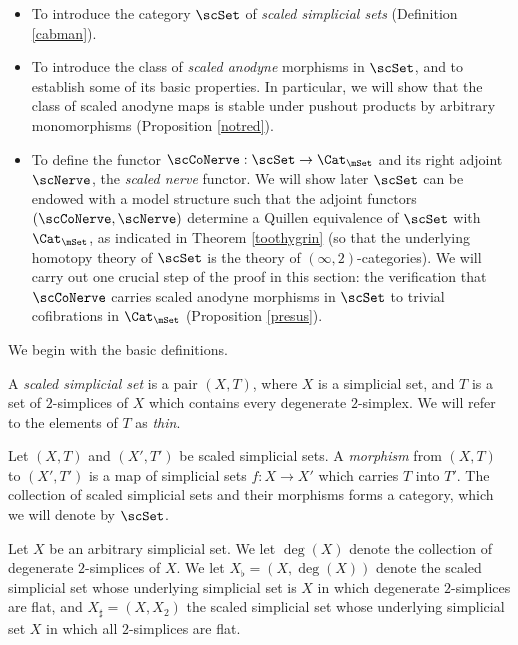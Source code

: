 \begin{itemize}
\item[$(a)$] To introduce the category $\scSet$ of {\it scaled simplicial sets}
(Definition \ref{cabman}).

\item[$(b)$] To introduce the class of {\it scaled anodyne} morphisms in
$\scSet$, and to establish some of its basic properties.
In particular, we will show that the class of scaled anodyne maps is stable
under pushout products by arbitrary monomorphisms (Proposition \ref{notred}).

\item[$(c)$] To define the functor $\scCoNerve: \scSet \rightarrow \Cat_{\mSet}$ and
its right adjoint $\scNerve$, the {\it scaled nerve} functor. We will show later
$\scSet$ can be endowed with a model structure such that the adjoint functors
$(\scCoNerve, \scNerve)$ determine a Quillen equivalence of $\scSet$ with
$\Cat_{\mSet}$, as indicated in Theorem \ref{toothygrin} (so that the underlying
homotopy theory of $\scSet$ is the theory of $(\infty,2)$-categories). We will carry
out one crucial step of the proof in this section: the verification that
$\scCoNerve$ carries scaled anodyne morphisms in $\scSet$ to
trivial cofibrations in $\Cat_{\mSet}$ (Proposition \ref{presus}).
\end{itemize}

We begin with the basic definitions.

\begin{definition}\label{cabman}
A {\it scaled simplicial set} is a pair $(X, T)$, where
$X$ is a simplicial set, and $T$ is
a set of $2$-simplices of $X$ which contains every degenerate $2$-simplex.
We will refer to the elements of $T$ as {\it thin}.

Let $(X,T)$ and $(X',T')$ be scaled simplicial sets. A {\it morphism} from 
$(X,T)$ to $(X',T')$ is a map of simplicial sets $f: X \rightarrow X'$ which
carries $T$ into $T'$. The collection of scaled simplicial sets and their morphisms
forms a category, which we will denote by $\scSet$.
\end{definition}

\begin{notation}
Let $X$ be an arbitrary simplicial set. We let
$\deg(X)$ denote the collection of degenerate $2$-simplices of $X$.
We let $X_{\flat} = (X, \deg(X) )$ denote the scaled simplicial set whose underlying simplicial
set is $X$ in which degenerate $2$-simplices are flat, and $X_{\sharp} = (X, X_{2} )$ the scaled simplicial set whose underlying simplicial set $X$ in which all $2$-simplices are flat.
\end{notation}

